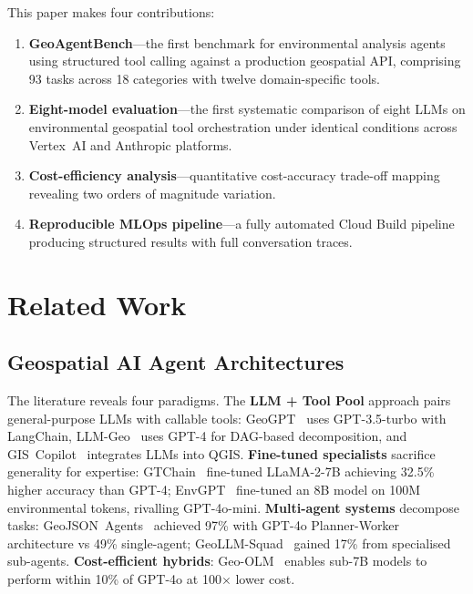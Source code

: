 \documentclass[10pt,twocolumn]{article}
\begin{document}
This paper makes four contributions:
\begin{enumerate}
  \item \textbf{GeoAgentBench}---the first benchmark for environmental analysis agents using structured tool calling against a production geospatial API, comprising 93 tasks across 18 categories with twelve domain-specific tools.
  \item \textbf{Eight-model evaluation}---the first systematic comparison of eight LLMs on environmental geospatial tool orchestration under identical conditions across Vertex~AI and Anthropic platforms.
  \item \textbf{Cost-efficiency analysis}---quantitative cost-accuracy trade-off mapping revealing two orders of magnitude variation.
  \item \textbf{Reproducible MLOps pipeline}---a fully automated Cloud Build pipeline producing structured results with full conversation traces.
\end{enumerate}


\section{Related Work}
\label{sec:related}

\subsection{Geospatial AI Agent Architectures}

The literature reveals four paradigms. The \textbf{LLM + Tool Pool} approach pairs general-purpose LLMs with callable tools: GeoGPT~\cite{zhang2023geogpt} uses GPT-3.5-turbo with LangChain, LLM-Geo~\cite{li2023llmgeo} uses GPT-4 for DAG-based decomposition, and GIS~Copilot~\cite{akinboyewa2024giscopilot} integrates LLMs into QGIS. \textbf{Fine-tuned specialists} sacrifice generality for expertise: GTChain~\cite{zhang2024gtchain} fine-tuned LLaMA-2-7B achieving 32.5\% higher accuracy than GPT-4; EnvGPT~\cite{zhang2025envgpt} fine-tuned an 8B model on 100M environmental tokens, rivalling GPT-4o-mini. \textbf{Multi-agent systems} decompose tasks: GeoJSON~Agents~\cite{luo2025geojsonagents} achieved 97\% with GPT-4o Planner-Worker architecture vs 49\% single-agent; GeoLLM-Squad~\cite{lee2025geollmsquad} gained 17\% from specialised sub-agents. \textbf{Cost-efficient hybrids}: Geo-OLM~\cite{stamoulis2025geoolm} enables sub-7B models to perform within 10\% of GPT-4o at 100$\times$ lower cost.
\end{document}
